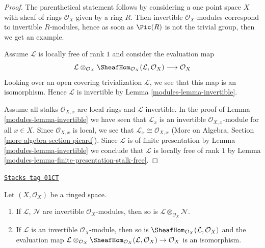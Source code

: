 \begin{proof}

The parenthetical statement follows by considering a one point
space $X$ with sheaf of rings $\mathcal{O}_X$ given by a ring $R$.
Then invertible $\mathcal{O}_X$-modules correspond to invertible
$R$-modules, hence as soon as $\Pic(R)$ is not the trivial group,
then we get an example.

\medskip\noindent
Assume $\mathcal{L}$ is locally free of rank $1$ and consider the
evaluation map
$$
\mathcal{L} \otimes_{\mathcal{O}_X}
\SheafHom_{\mathcal{O}_X}(\mathcal{L}, \mathcal{O}_X)
\longrightarrow \mathcal{O}_X
$$
Looking over an open covering trivialization $\mathcal{L}$, we see
that this map is an isomorphism. Hence $\mathcal{L}$ is invertible
by Lemma \ref{modules-lemma-invertible}.

\medskip\noindent
Assume all stalks $\mathcal{O}_{X, x}$ are local rings and $\mathcal{L}$
invertible. In the proof of Lemma \ref{modules-lemma-invertible}
we have seen that $\mathcal{L}_x$ is an invertible
$\mathcal{O}_{X, x}$-module for all $x \in X$. Since
$\mathcal{O}_{X, x}$ is local, we see that
$\mathcal{L}_x \cong \mathcal{O}_{X, x}$
(More on Algebra, Section \ref{more-algebra-section-picard}).
Since $\mathcal{L}$ is of finite presentation by
Lemma \ref{modules-lemma-invertible} we conclude that $\mathcal{L}$
is locally free of rank $1$ by
Lemma \ref{modules-lemma-finite-presentation-stalk-free}.
\end{proof}

\begin{lemma}
\label{modules-lemma-constructions-invertible}
\href{https://stacks.math.columbia.edu/tag/01CT}{\texttt{Stacks tag 01CT}}

Let $(X, \mathcal{O}_X)$ be a ringed space.
\begin{enumerate}
\item If $\mathcal{L}$, $\mathcal{N}$ are invertible
$\mathcal{O}_X$-modules, then so is
$\mathcal{L} \otimes_{\mathcal{O}_X} \mathcal{N}$.
\item If $\mathcal{L}$ is an invertible $\mathcal{O}_X$-module, then so is
$\SheafHom_{\mathcal{O}_X}(\mathcal{L}, \mathcal{O}_X)$ and the evaluation map
$\mathcal{L} \otimes_{\mathcal{O}_X}
\SheafHom_{\mathcal{O}_X}(\mathcal{L}, \mathcal{O}_X) \to \mathcal{O}_X$
is an isomorphism.
\end{enumerate}
\end{lemma}

